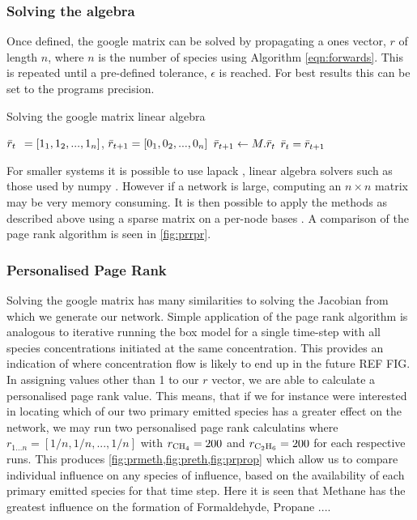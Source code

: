 \documentclass[twoside,reqno]{article}
\newcommand{\ch}[1]{\MakeUppercase{\ce{#1}}}  %
\begin{document}
\subsubsection{Solving the algebra}

Once defined, the google matrix can be solved by propagating a ones vector, $r$ of length $n$, where $n$ is the number of species using Algorithm \ref{eqn:forwards}. This is repeated until a pre-defined tolerance, $\epsilon$ is reached. For best results this can be set to the programs precision.

\begin{algorithm} \caption{Solving the google matrix linear algebra}
\begin{algorithmic}[1]
\State  $\Bar{r}_t \:\:= [1_1, 1_2, ... , 1_n]$, $\Bar{r}_{t+1} = [0_1, 0_2, ... , 0_n]$
\State
{}
\State $\Bar{r}_{t+1} \gets M . \Bar{r}_t$
\State $\Bar{r}_t = \Bar{r}_{t+1}$
\EndWhile
\end{algorithmic}\label{eqn:forwards}
\end{algorithm}

For smaller systems it is possible to use lapack \cite{lapack}, linear algebra solvers such as those used by numpy \cite{numpy}. However if a network is large, computing an $n \times n $ matrix may be very memory consuming. It is then possible to apply the methods as described above using a sparse matrix on a per-node bases \cite{scipy,networkx}. A comparison of the page rank algorithm is seen in \autoref{fig:prrpr}.


\subsubsection{Personalised Page Rank}
Solving the google matrix has many similarities to solving the Jacobian from which we generate our network. Simple application of the page rank algorithm is analogous to iterative running the box model for a single time-step with all species concentrations initiated at the same concentration. This provides an indication of where concentration flow is likely to end up in the future REF FIG.\\

In assigning values other than 1 to our $r$ vector, we are able to calculate a personalised page rank value. This means, that if we for instance were interested in locating which of our two primary emitted species has a greater effect on the network, we may run two personalised page rank calculatins where $r_{1...n}=[1/n,1/n,...,1/n]$ with $r_{\ch{ch4}} = 200 $ and $r_{\ch{c2h6}} = 200 $ for each respective runs. This produces \autoref{fig:prmeth,fig:preth,fig:prprop} which allow us to compare individual influence on any species of influence, based on the availability of each primary emitted species for that time step. Here it is seen that Methane has the greatest influence on the formation of Formaldehyde, Propane ....
\end{document}
